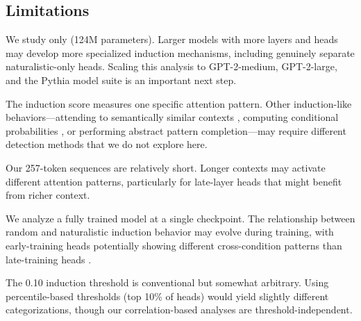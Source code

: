 \subsection{Limitations}
\label{sec:limitations}

We study only \gpttwo (124M parameters).
Larger models with more layers and heads may develop more specialized induction mechanisms, including genuinely separate naturalistic-only heads.
Scaling this analysis to GPT-2-medium, GPT-2-large, and the Pythia model suite is an important next step.

The induction score measures one specific attention pattern.
Other induction-like behaviors---attending to semantically similar contexts \cite{ren2024identifying}, computing conditional probabilities \cite{edelman2024evolution}, or performing abstract pattern completion---may require different detection methods that we do not explore here.

Our 257-token sequences are relatively short.
Longer contexts may activate different attention patterns, particularly for late-layer heads that might benefit from richer context.

We analyze a fully trained model at a single checkpoint.
The relationship between random and naturalistic induction behavior may evolve during training, with early-training heads potentially showing different cross-condition patterns than late-training heads \cite{olsson2022context, singh2024needs}.

The 0.10 induction threshold is conventional but somewhat arbitrary.
Using percentile-based thresholds (top 10\% of heads) would yield slightly different categorizations, though our correlation-based analyses are threshold-independent.
